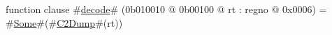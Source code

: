function clause #\hyperref[zdecode]{decode}# (0b010010 @ 0b00100 @ rt : regno @ 0x0006) = #\hyperref[zSome]{Some}#(#\hyperref[zCtwoDump]{C2Dump}#(rt))
